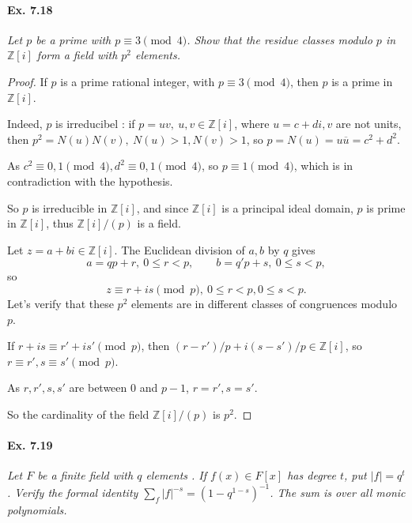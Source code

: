 \documentclass[11pt,a4paper]{article}
\newcommand{\Z}{\mathbb{Z}}
\begin{document}
\paragraph{Ex. 7.18}

{\it Let $p$ be a prime with $p\equiv 3 \pmod 4$. Show that the residue classes modulo $p$ in $\Z[i]$ form a field with $p^2$ elements.
}

\begin{proof}
If $p$ is a prime rational integer, with $p\equiv 3 \pmod 4$, then $p$ is a prime in $\Z[i]$.

Indeed, $p$ is irreducibel : if $p = uv,\ u,v \in \Z[i]$, where $u = c+di,v$ are not units, then $p^2 = N(u)N(v),\ N(u)>1,N(v)>1$, so $p = N(u) = u \overline{u} = c^2+d^2$.

 As $c^2\equiv 0,1 \pmod 4, d^2 \equiv 0,1 \pmod 4$, so $p \equiv1 \pmod 4$, which is in contradiction with the hypothesis.
 
 So $p$ is irreducible in $\Z[i]$, and since $\Z[i]$ is a principal ideal domain, $p$ is prime in $\Z[i]$, thus $\Z[i]/( p )$ is a field.
 
 Let $z = a+bi \in \Z[i]$. The Euclidean division of $a,b$ by $q$ gives 
 $$a = qp+r,\ 0\leq r < p, \qquad b = q'p+s, \ 0\leq s < p,$$
 so $$z \equiv r+is \pmod p,\ 0\leq r <p, 0 \leq s < p.$$
 Let's verify that these $p^2$ elements are in different classes of congruences modulo $p$.
 
 If $r+is \equiv r'+is' \pmod p$, then $(r-r')/p + i(s-s')/p \in \Z[i]$, so $r\equiv r',s\equiv s' \pmod p$.
 
 As $r,r',s,s'$ are between $0$ and $p-1$, $r=r', s= s'$.
 
 So the cardinality of the field $\Z[i]/( p )$ is $p^2$.
\end{proof}

\paragraph{Ex. 7.19}

{\it Let $F$ be a finite field with $q$ elements . If $f(x) \in F[x]$ has degree $t$, put $|f| = q^t$. Verify the formal identity $\sum_f |f|^{-s} = (1-q^{1-s})^{-1}$. The sum is over all monic polynomials.

}
\end{document}
